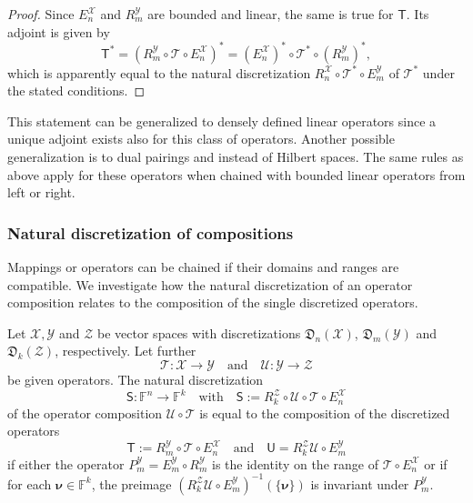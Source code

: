 \documentclass[a4paper]{paper}
\newcommand{\Discr}{\mathfrak{D}}
\newcommand{\Spc}[1]{\mathscr{#1}}
\newcommand{\Field}{\mathbb{F}}
\newcommand{\Op}[1]{\mathcal{#1}}
\newcommand{\DiscOp}[1]{\mathsf{#1}}
\newcommand*{\EXT}[2]{\ensuremath{E_{#1}^{#2}}}
\newcommand*{\REST}[2]{\ensuremath{R_{#1}^{#2}}}
\newcommand*{\PROJ}[2]{\ensuremath{P_{#1}^{#2}}}
\newcommand*{\RnX}{\ensuremath{\REST{n}{\Spc{X}}}}
\newcommand*{\RmY}{\ensuremath{\REST{m}{\Spc{Y}}}}
\newcommand*{\EnX}{\ensuremath{\EXT{n}{\Spc{X}}}}
\newcommand*{\EmY}{\ensuremath{\EXT{m}{\Spc{Y}}}}
\newcommand*{\PmY}{\ensuremath{\PROJ{m}{\Spc{Y}}}}
\newcommand{\vnu}{\boldsymbol{\nu}}
\begin{document}
\begin{proof}
 Since $\EnX$ and $\RmY$ are bounded and linear, the same is true for $\DiscOp{T}$. Its adjoint is given by
 \begin{equation*}
  \DiscOp{T}^* = (\RmY \circ \Op{T} \circ \EnX)^* = (\EnX)^* \circ \Op{T}^* \circ (\RmY)^*,
 \end{equation*}
 which is apparently equal to the natural discretization $\RnX \circ \Op{T}^* \circ \EmY$ of $\Op{T}^*$ under the 
 stated conditions.
\end{proof}

\begin{remark}
 This statement can be generalized to densely defined linear operators since a unique adjoint exists also for this 
 class of operators. Another possible generalization is to dual pairings and instead of Hilbert spaces. The same rules 
 as above apply for these operators when chained with bounded linear operators from left or right.
\end{remark}


\subsubsection{Natural discretization of compositions}

Mappings or operators can be chained if their domains and ranges are compatible. We investigate how the natural 
discretization of an operator composition relates to the composition of the single discretized operators.

\begin{lemma}
 Let $\Spc{X}, \Spc{Y}$ and $\Spc{Z}$ be vector spaces with discretizations $\Discr_n(\Spc{X})$, 
 $\Discr_m(\Spc{Y})$ and $\Discr_k(\Spc{Z})$, respectively. Let further
 \begin{equation*}
  \Op{T} \colon \Spc{X} \to \Spc{Y} \quad \text{and} \quad \Op{U} \colon \Spc{Y} \to \Spc{Z}
 \end{equation*}
 be given operators. The natural discretization
 \begin{equation*}
  \DiscOp{S} \colon \Field^n \to \Field^k 
  \quad \text{with} \quad
  \DiscOp{S} := \REST{k}{\Spc{Z}} \circ \Op{U} \circ \Op{T} \circ \EnX
 \end{equation*}
 of the operator composition $\Op{U} \circ \Op{T}$ is equal to the composition of the discretized operators
 \begin{equation*}
  \DiscOp{T} := \RmY \circ \Op{T} \circ \EnX
  \quad \text{and} \quad
  \DiscOp{U} = \REST{k}{\Spc{Z}} \Op{U} \circ \EmY
 \end{equation*}
 if either the operator $\PmY = \EmY \circ \RmY$ is the identity on the range of $\Op{T} \circ \EnX$ or if for each 
$\vnu \in \Field^k$,  
 the preimage $(\REST{k}{\Spc{Z}} \Op{U} \circ \EmY)^{-1}(\{\vnu\})$ is invariant under $\PmY$.
\end{lemma}
\end{document}
